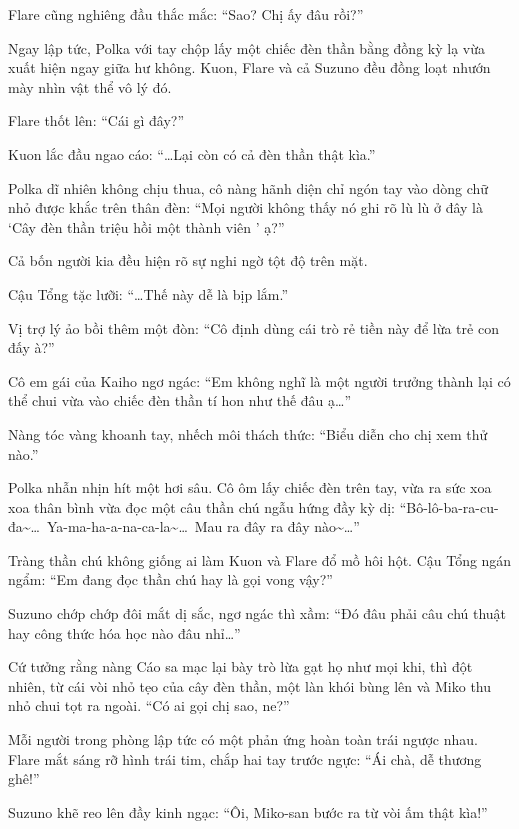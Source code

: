 \documentclass[../main.tex]{subfiles}
\begin{document}
Flare cũng nghiêng đầu thắc mắc: ``Sao? Chị ấy đâu rồi?''

Ngay lập tức, Polka với tay chộp lấy một chiếc đèn thần bằng đồng kỳ lạ vừa xuất hiện ngay giữa hư không. Kuon, Flare và cả Suzuno đều đồng loạt nhướn mày nhìn vật thể vô lý đó.

Flare thốt lên: ``Cái gì đây?''

Kuon lắc đầu ngao cáo: ``\dots Lại còn có cả đèn thần thật kìa.''

Polka dĩ nhiên không chịu thua, cô nàng hãnh diện chỉ ngón tay vào dòng chữ nhỏ được khắc trên thân đèn: ``Mọi người không thấy nó ghi rõ lù lù ở đây là `Cây đèn thần triệu hồi một thành viên \hll' ạ?''


Cả bốn người kia đều hiện rõ sự nghi ngờ tột độ trên mặt.

Cậu Tổng tặc lưỡi: ``\dots Thế này dễ là bịp lắm.''

Vị trợ lý ảo bồi thêm một đòn: ``Cô định dùng cái trò rẻ tiền này để lừa trẻ con đấy à?''

Cô em gái của Kaiho ngơ ngác: ``Em không nghĩ là một người trưởng thành lại có thể chui vừa vào chiếc đèn thần tí hon như thế đâu ạ\dots''

Nàng tóc vàng khoanh tay, nhếch môi thách thức: ``Biểu diễn cho chị xem thử nào.''

Polka nhẫn nhịn hít một hơi sâu. Cô ôm lấy chiếc đèn trên tay, vừa ra sức xoa xoa thân bình vừa đọc một câu thần chú ngẫu hứng đầy kỳ dị: ``Bô-lô-ba-ra-cu-đa\~{}{}\dots\ Ya-ma-ha-a-na-ca-la\~{}{}\dots\ Mau ra đây ra đây nào\~{}{}\dots''


Tràng thần chú không giống ai làm Kuon và Flare đổ mồ hôi hột. Cậu Tổng ngán ngẩm: ``Em đang đọc thần chú hay là gọi vong vậy?''

Suzuno chớp chớp đôi mắt dị sắc, ngơ ngác thì xầm: ``Đó đâu phải câu chú thuật hay công thức hóa học nào đâu nhỉ\dots''

Cứ tưởng rằng nàng Cáo sa mạc lại bày trò lừa gạt họ như mọi khi, thì đột nhiên, từ cái vòi nhỏ tẹo của cây đèn thần, một làn khói bùng lên và Miko thu nhỏ chui tọt ra ngoài. ``Có ai gọi chị sao, ne?''


Mỗi người trong phòng lập tức có một phản ứng hoàn toàn trái ngược nhau. Flare mắt sáng rỡ hình trái tim, chắp hai tay trước ngực: ``Ái chà, dễ thương ghê!''

Suzuno khẽ reo lên đầy kinh ngạc: ``Ôi, Miko-san bước ra từ vòi ấm thật kìa!''
\end{document}
